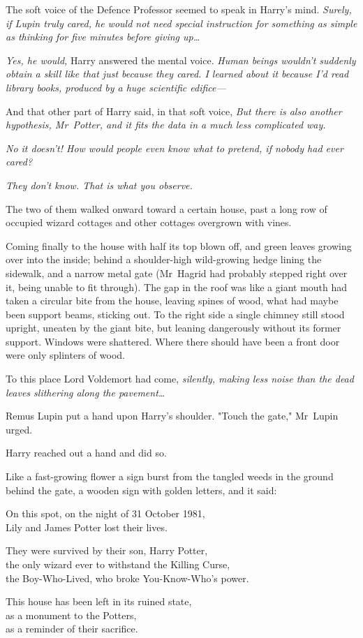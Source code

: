 The soft voice of the Defence Professor seemed to speak in Harry's mind.
\emph{Surely, if Lupin truly cared, he would not need special instruction for
something as simple as thinking for five minutes before giving up{\ldots}}

\emph{Yes, he would,} Harry answered the mental voice. \emph{Human beings
wouldn't suddenly obtain a skill like that just because they cared. I learned
about it because I'd read library books, produced by a huge scientific
edifice---}

And that other part of Harry said, in that soft voice, \emph{But there is also
another hypothesis, Mr~Potter, and it fits the data in a much less complicated
way.}

\emph{No it doesn't! How would people even know what to pretend, if nobody had
ever cared?}

\emph{They don't know. That is what you observe.}

The two of them walked onward toward a certain house, past a long row of
occupied wizard cottages and other cottages overgrown with vines.

Coming finally to the house with half its top blown off, and green leaves
growing over into the inside; behind a shoulder-high wild-growing hedge lining
the sidewalk, and a narrow metal gate (Mr~Hagrid had probably stepped right
over it, being unable to fit through). The gap in the roof was like a giant
mouth had taken a circular bite from the house, leaving spines of wood, what
had maybe been support beams, sticking out. To the right side a single chimney
still stood upright, uneaten by the giant bite, but leaning dangerously without
its former support. Windows were shattered. Where there should have been a
front door were only splinters of wood.

To this place Lord Voldemort had come, \emph{silently, making less noise than
the dead leaves slithering along the pavement{\ldots}}

Remus Lupin put a hand upon Harry's shoulder. "Touch the gate," Mr~Lupin urged.

Harry reached out a hand and did so.

Like a fast-growing flower a sign burst from the tangled weeds in the ground
behind the gate, a wooden sign with golden letters, and it said:

\begin{center}
On this spot, on the night of 31 October 1981,\\
Lily and James Potter lost their lives.

They were survived by their son, Harry Potter,\\
the only wizard ever to withstand the Killing Curse,\\
the Boy-Who-Lived, who broke You-Know-Who's power.

This house has been left in its ruined state,\\
as a monument to the Potters,\\
as a reminder of their sacrifice.
\end{center}

